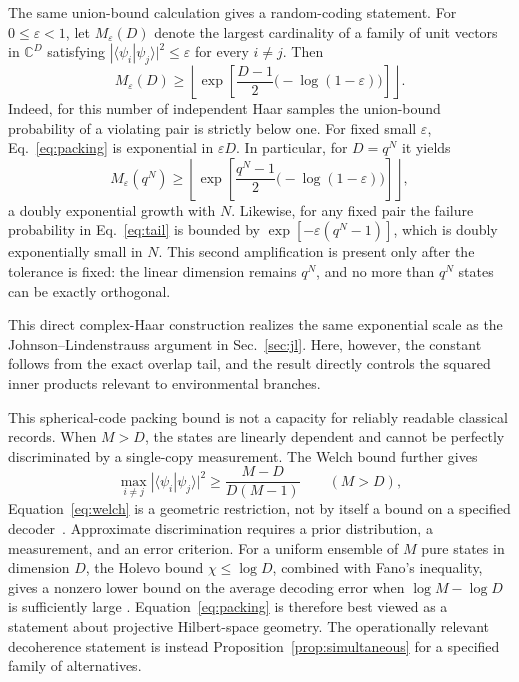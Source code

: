 \documentclass[aps,pra,reprint,superscriptaddress,nofootinbib,longbibliography]{revtex4-2}
\newcommand{\eps}{\varepsilon}
\begin{document}
The same union-bound calculation gives a random-coding statement.  For
$0\leq\eps<1$, let
$M_\eps(D)$ denote the largest cardinality of a family of unit vectors in
$\mathbb C^D$ satisfying
$|\langle\psi_i|\psi_j\rangle|^2\leq\eps$ for every $i\neq j$.  Then
\begin{equation}
 M_\eps(D)\geq
 \left\lfloor
 \exp\!\left[\frac{D-1}{2}\bigl(-\log(1-\eps)\bigr)\right]
 \right\rfloor.
 \label{eq:packing}
\end{equation}
Indeed, for this number of independent Haar samples the union-bound
probability of a violating pair is strictly below one.  For fixed small
$\eps$, Eq.~\eqref{eq:packing} is exponential in $\eps D$.  In particular,
for $D=q^N$ it yields
\begin{equation}
 M_\eps(q^N)\geq
 \left\lfloor\exp\!\left[
 \frac{q^N-1}{2}\bigl(-\log(1-\eps)\bigr)
 \right]\right\rfloor,
 \label{eq:packing-tensor}
\end{equation}
a doubly exponential growth with $N$.  Likewise, for any fixed pair the
failure probability in Eq.~\eqref{eq:tail} is bounded by
$\exp[-\eps(q^N-1)]$, which is doubly exponentially small in $N$.
This second amplification is present only after the tolerance is fixed: the
linear dimension remains $q^N$, and no more than $q^N$ states can be exactly
orthogonal.

This direct complex-Haar construction realizes the same exponential scale as
the Johnson--Lindenstrauss argument in Sec.~\ref{sec:jl}.  Here, however, the
constant follows from the exact overlap tail, and the result directly
controls the squared inner products relevant to environmental branches.

This spherical-code packing bound is not a capacity for reliably readable
classical records.  When $M>D$, the states are linearly dependent and cannot
be perfectly discriminated by a single-copy measurement.  The Welch bound
further gives
\begin{equation}
 \max_{i\neq j}|\langle\psi_i|\psi_j\rangle|^2
 \geq \frac{M-D}{D(M-1)}
 \qquad (M>D),
 \label{eq:welch}
\end{equation}
Equation~\eqref{eq:welch} is a geometric restriction, not by itself a bound
on a specified decoder~\cite{welch1974coherence}.  Approximate discrimination
requires a prior distribution, a measurement, and an error criterion.  For a
uniform ensemble of $M$ pure states in dimension $D$, the Holevo bound
$\chi\leq\log D$, combined with Fano's inequality, gives a nonzero lower bound
on the average decoding error when $\log M-\log D$ is sufficiently large
\cite{Holevo1973,nielsen-book10}.  Equation~\eqref{eq:packing} is therefore
best viewed as a statement about projective Hilbert-space geometry.  The
operationally relevant decoherence statement is instead
Proposition~\ref{prop:simultaneous} for a specified family of alternatives.
\end{document}
